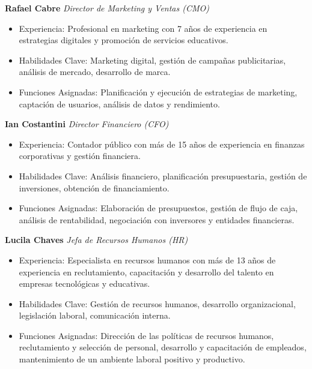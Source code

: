 \documentclass[
]{article}
\providecommand{\tightlist}{%
  \setlength{\itemsep}{0pt}\setlength{\parskip}{0pt}}
\begin{document}
\newpage

\textbf{Rafael Cabre} \emph{Director de Marketing y Ventas (CMO)}

\begin{itemize}
\tightlist
\item
  Experiencia: Profesional en marketing con 7 años de experiencia en
  estrategias digitales y promoción de servicios educativos.
\item
  Habilidades Clave: Marketing digital, gestión de campañas
  publicitarias, análisis de mercado, desarrollo de marca.
\item
  Funciones Asignadas: Planificación y ejecución de estrategias de
  marketing, captación de usuarios, análisis de datos y rendimiento.
\end{itemize}

\textbf{Ian Costantini} \emph{Director Financiero (CFO)}

\begin{itemize}
\tightlist
\item
  Experiencia: Contador público con más de 15 años de experiencia en
  finanzas corporativas y gestión financiera.
\item
  Habilidades Clave: Análisis financiero, planificación presupuestaria,
  gestión de inversiones, obtención de financiamiento.
\item
  Funciones Asignadas: Elaboración de presupuestos, gestión de flujo de
  caja, análisis de rentabilidad, negociación con inversores y entidades
  financieras.
\end{itemize}

\textbf{Lucila Chaves} \emph{Jefa de Recursos Humanos (HR)}

\begin{itemize}
\tightlist
\item
  Experiencia: Especialista en recursos humanos con más de 13 años de
  experiencia en reclutamiento, capacitación y desarrollo del talento en
  empresas tecnológicas y educativas.
\item
  Habilidades Clave: Gestión de recursos humanos, desarrollo
  organizacional, legislación laboral, comunicación interna.
\item
  Funciones Asignadas: Dirección de las políticas de recursos humanos,
  reclutamiento y selección de personal, desarrollo y capacitación de
  empleados, mantenimiento de un ambiente laboral positivo y productivo.
\end{itemize}

\newpage
\end{document}
